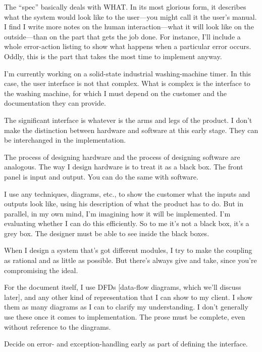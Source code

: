 \begin{tfquot}
The ``spec'' basically deals with WHAT. In its most glorious form, it
describes what the system would look like to the user---you might call it the
user's manual. I find I write more notes on the human interaction---what it
will look like on the outside---than on the part that gets the job done. For
instance, I'll include a whole error-action listing to show what happens when
a particular error occurs. Oddly, this is the part that takes the most time to
implement anyway.

I'm currently working on a solid-state industrial washing-machine timer. In
this case, the user interface is not that complex. What is complex is the
interface to the washing machine, for which I must depend on the customer
and the documentation they can provide.

The significant interface is whatever is the arms and legs of the product. I
don't make the distinction between hardware and software at this early
stage. They can be interchanged in the implementation.

The process of designing hardware and the process of designing software
are analogous. The way I design hardware is to treat it as a black box. The
front panel is input and output. You can do the same with software.

I use any techniques, diagrams, etc., to show the customer what the inputs
and outputs look like, using his description of what the product has to do.
But in parallel, in my own mind, I'm imagining how it will be implemented.
I'm evaluating whether I can do this efficiently. So to me it's not a black
box, it's a grey box. The designer must be able to see inside the black boxes.

When I design a system that's got different modules, I try to make the
coupling as rational and as little as possible. But there's always give and
take, since you're compromising the ideal.

For the document itself, I use DFDs {[}data-flow diagrams, which we'll
discuss later{]}, and any other kind of representation that I can show to my
client. I show them as many diagrams as I can to clarify my understanding.
I don't generally use these once it comes to implementation. The prose
must be complete, even without reference to the diagrams.
\end{tfquot}
\blackline{2ex}

\begin{tip}
Decide on error- and exception-handling early as part of defining the
interface.
\end{tip}

